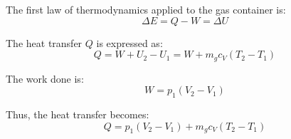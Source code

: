 The first law of thermodynamics applied to the gas container is:  
\[
\Delta E = Q - W = \Delta U
\]

The heat transfer \( Q \) is expressed as:  
\[
Q = W + U_2 - U_1 = W + m_g c_V (T_2 - T_1)
\]

The work done is:  
\[
W = p_1 (V_2 - V_1)
\]

Thus, the heat transfer becomes:  
\[
Q = p_1 (V_2 - V_1) + m_g c_V (T_2 - T_1)
\]